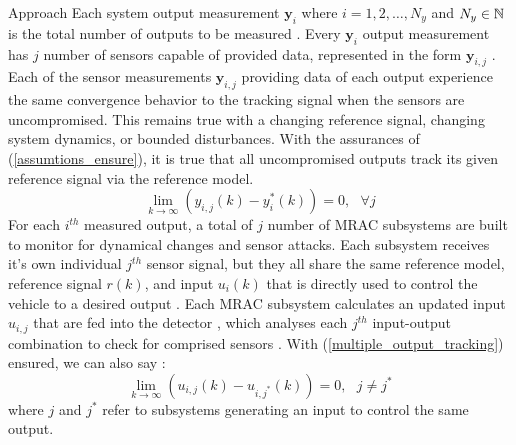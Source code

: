 \begin{section}{Approach}
Each system output measurement $\bm{y}_i$  where $i=1,2,\dots,N_y$ and $N_y \in \mathbb{N}$ is the total number of outputs to be measured . Every $\bm{y}_i$ output measurement has $j$ number of sensors capable of provided data, represented in the form $\bm{y}_{i,j}$ . Each of the sensor measurements $\bm{y}_{i,j}$ providing data of each output experience the same convergence behavior to the tracking signal when the sensors are uncompromised. This remains true with a changing reference signal, changing system dynamics, or bounded disturbances. 
With the assurances  of (\ref{assumtions_ensure}), it is true that all uncompromised outputs track its given reference signal via the reference model.
\begin{equation}
\label{multiple_output_tracking}
    \lim_{k\to\infty}(y_{i,j}(k)-y^*_i(k))=0, \text{ }\forall j
\end{equation}
For each $i^{th}$ measured output, a total of $j$ number of MRAC subsystems are built to monitor for dynamical changes and sensor attacks.  Each subsystem receives it's own individual $j^{th}$ sensor signal, but they all share the same reference model, reference signal $r(k)$, and input $u_i(k)$ that is directly used to control the vehicle to a desired output . Each MRAC subsystem calculates an updated input $u_{i,j}$ that are fed into the detector , which analyses each $j^{th}$ input-output combination to check for comprised  sensors . With (\ref{multiple_output_tracking}) ensured, we can also say :
\begin{equation}
    \lim_{k\to\infty}(u_{i,j}(k)-u_{i,j^*}(k))=0, \text{ }j\neq j^*
\end{equation}
where $j$ and $j^*$ refer to subsystems generating an input to control the same output.



\end{section}
